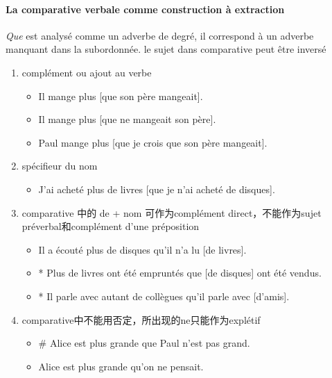 \documentclass[UTF8]{report}
\begin{document}
\paragraph{La comparative verbale comme construction à extraction}
\textit{Que} est analysé comme un adverbe de degré, il correspond à un adverbe manquant dans la subordonnée. le sujet dans comparative peut être inversé
\begin{enumerate}
    \item complément ou ajout au verbe
    \begin{itemize}
        \item Il mange plus [que son père mangeait].
        \item Il mange plus [que ne mangeait son père].
        \item Paul mange plus [que je crois que son père mangeait].
    \end{itemize}
    \item spécifieur du nom
    \begin{itemize}
        \item J’ai acheté plus de livres [que je n’ai acheté de disques].
    \end{itemize}
    \item comparative 中的 de + nom 可作为complément direct，不能作为sujet préverbal和complément d’une préposition
    \begin{itemize}
        \item Il a écouté plus de disques qu’il n’a lu [de livres].
        \item * Plus de livres ont été empruntés que [de disques] ont été vendus.
        \item * Il parle avec autant de collègues qu’il parle avec [d’amis].
    \end{itemize}
    \item comparative中不能用否定，所出现的ne只能作为explétif
    \begin{itemize}
        \item \# Alice est plus grande que Paul n’est pas grand.
        \item Alice est plus grande qu’on ne pensait.
    \end{itemize}
\end{enumerate}
\end{document}
